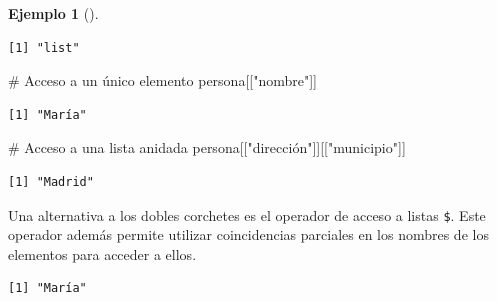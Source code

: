 \documentclass[
  a4paper,
]{scrreport}
\newenvironment{Shaded}{\begin{snugshade}}{\end{snugshade}}
\newcommand{\CommentTok}[1]{\textcolor[rgb]{0.37,0.37,0.37}{#1}}
\newcommand{\DecValTok}[1]{\textcolor[rgb]{0.68,0.00,0.00}{#1}}
\newcommand{\FunctionTok}[1]{\textcolor[rgb]{0.28,0.35,0.67}{#1}}
\newcommand{\NormalTok}[1]{\textcolor[rgb]{0.00,0.23,0.31}{#1}}
\newcommand{\OtherTok}[1]{\textcolor[rgb]{0.00,0.23,0.31}{#1}}
\newcommand{\SpecialCharTok}[1]{\textcolor[rgb]{0.37,0.37,0.37}{#1}}
\newcommand{\StringTok}[1]{\textcolor[rgb]{0.13,0.47,0.30}{#1}}
\theoremstyle{definition}
\theoremstyle{definition}
\newtheorem{example}{Ejemplo}[chapter]
\theoremstyle{remark}
\begin{document}
\begin{example}[]
\begin{verbatim}
[1] "list"
\end{verbatim}

\begin{Shaded}
\begin{Highlighting}[]
\CommentTok{\# Acceso a un único elemento}
\NormalTok{persona[[}\StringTok{"nombre"}\NormalTok{]]}
\end{Highlighting}
\end{Shaded}

\begin{verbatim}
[1] "María"
\end{verbatim}

\begin{Shaded}
\begin{Highlighting}[]
\CommentTok{\# Acceso a una lista anidada}
\NormalTok{persona[[}\StringTok{"dirección"}\NormalTok{]][[}\StringTok{"municipio"}\NormalTok{]]}
\end{Highlighting}
\end{Shaded}

\begin{verbatim}
[1] "Madrid"
\end{verbatim}

\end{example}

Una alternativa a los dobles corchetes es el operador de acceso a listas
\texttt{\$}. Este operador además permite utilizar coincidencias
parciales en los nombres de los elementos para acceder a ellos.

\begin{Shaded}
\end{Shaded}

\begin{verbatim}
[1] "María"
\end{verbatim}
\end{document}
